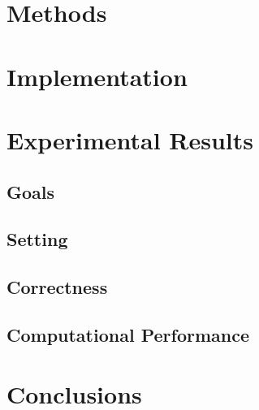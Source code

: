 \documentclass[draft]{article}
\begin{document}
\section{Methods}\label{sec:methods}


\section{Implementation}\label{sec:implementation}


\section{Experimental Results}\label{sec:experimental_results}


\subsection{Goals}\label{sec:goals}

\subsection{Setting}\label{sec:setting}

\subsection{Correctness}\label{sec:correctness}

\subsection{Computational Performance}\label{sec:computational_performance}

\section{Conclusions}\label{sec:conclusions}




\end{document}
